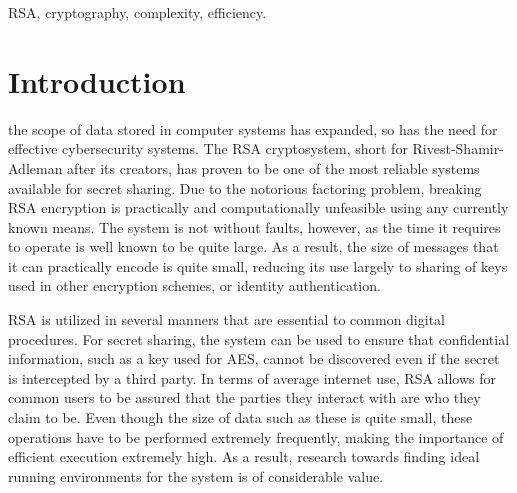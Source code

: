 \documentclass[journal]{IEEEtran}
\begin{document}
\begin{IEEEkeywords}
RSA, cryptography, complexity, efficiency.
\end{IEEEkeywords}


%
\IEEEpeerreviewmaketitle



\section{Introduction}
% 
% 
% 
% 
 the scope of data stored in computer systems has expanded, so has the need for effective cybersecurity systems. The RSA cryptosystem, short for Rivest-Shamir-Adleman after its creators, has proven to be one of the most reliable systems available for secret sharing. Due to the notorious factoring problem, breaking RSA encryption is practically and computationally unfeasible using any currently known means. The system is not without faults, however, as the time it requires to operate is well known to be quite large. As a result, the size of messages that it can practically encode is quite small, reducing its use largely to sharing of keys used in other encryption schemes, or identity authentication.

RSA is utilized in several manners that are essential to common digital procedures. For secret sharing, the system can be used to ensure that confidential information, such as a key used for AES, cannot be discovered even if the secret is intercepted by a third party. In terms of average internet use, RSA allows for common users to be assured that the parties they interact with are who they claim to be. Even though the size of data such as these is quite small, these operations have to be performed extremely frequently, making the importance of efficient execution extremely high. As a result, research towards finding ideal running environments for the system is of considerable value.
\end{document}

